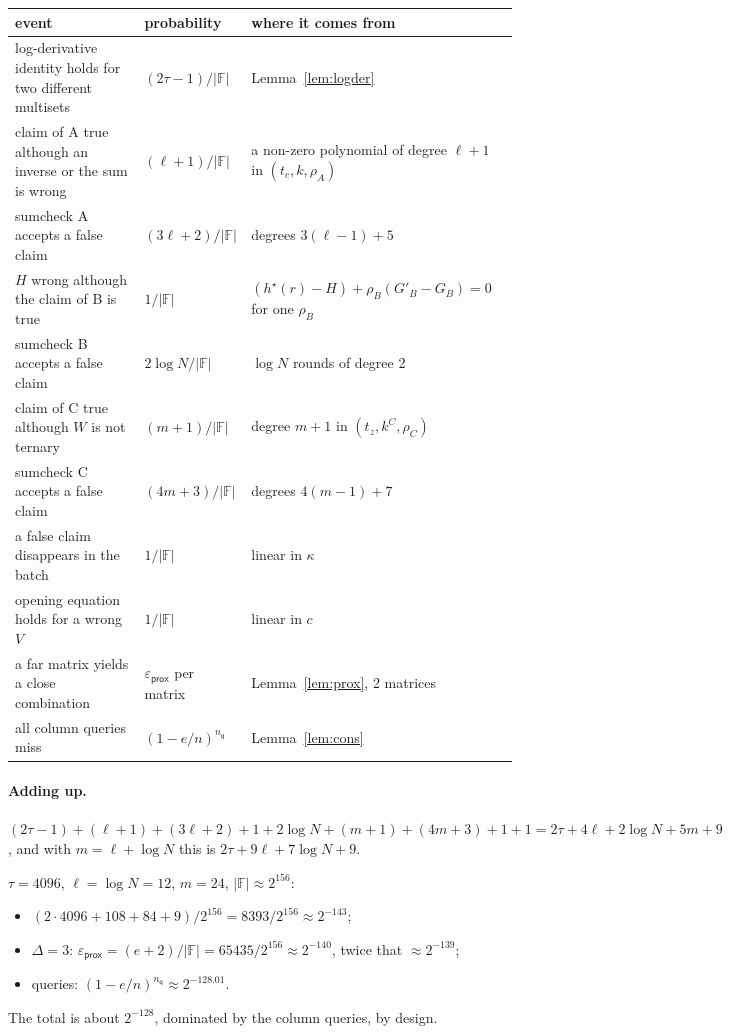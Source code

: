 \documentclass[11pt,a4paper]{article}
\newcommand{\F}{\mathbb{F}}
\newcommand{\msk}[1]{#1^{\star}}
\newcommand{\epsprox}{\varepsilon_{\mathsf{prox}}}
\newcommand{\nq}{n_{\mathsf{q}}}
\theoremstyle{definition}
\theoremstyle{plain}
\begin{document}
\begin{center}\small
\begin{tabular}{@{}p{}lp{}@{}}
\toprule
event & probability & where it comes from\\\midrule
log-derivative identity holds for two different multisets & $(2\tau-1)/|\F|$ & Lemma~\ref{lem:logder}\\
claim of A true although an inverse or the sum is wrong & $(\ell+1)/|\F|$ & a non-zero polynomial of degree $\ell+1$ in $(t_c,k,\rho_A)$\\
sumcheck A accepts a false claim & $(3\ell+2)/|\F|$ & degrees $3(\ell-1)+5$\\
$H$ wrong although the claim of B is true & $1/|\F|$ & $(\msk h(r)-H)+\rho_B(G'_B-G_B)=0$ for one $\rho_B$\\
sumcheck B accepts a false claim & $2\log N/|\F|$ & $\log N$ rounds of degree 2\\
claim of C true although $W$ is not ternary & $(m+1)/|\F|$ & degree $m+1$ in $(t_z,k^C,\rho_C)$\\
sumcheck C accepts a false claim & $(4m+3)/|\F|$ & degrees $4(m-1)+7$\\
a false claim disappears in the batch & $1/|\F|$ & linear in $\kappa$\\
opening equation holds for a wrong $V$ & $1/|\F|$ & linear in $c$\\
a far matrix yields a close combination & $\epsprox$ per matrix & Lemma~\ref{lem:prox}, 2 matrices\\
all column queries miss & $(1-e/n)^{\nq}$ & Lemma~\ref{lem:cons}\\
\bottomrule
\end{tabular}
\end{center}

\paragraph{Adding up.} $(2\tau-1)+(\ell+1)+(3\ell+2)+1+2\log N+(m+1)+(4m+3)+1+1=2\tau+4\ell+2\log N+5m+9$,
and with $m=\ell+\log N$ this is $2\tau+9\ell+7\log N+9$. \checkmark

\begin{example}
$\tau=4096$, $\ell=\log N=12$, $m=24$, $|\F|\approx 2^{156}$:
\begin{itemize}[leftmargin=1.2em]
\item $(2\cdot 4096+108+84+9)/2^{156}=8393/2^{156}\approx 2^{-143}$;
\item $\Delta=3$: $\epsprox=(e+2)/|\F|=65435/2^{156}\approx 2^{-140}$, twice that $\approx 2^{-139}$;
\item queries: $(1-e/n)^{\nq}\approx 2^{-128.01}$.
\end{itemize}
The total is about $2^{-128}$, dominated by the column queries, by design.
\end{example}
\end{document}
